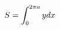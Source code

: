 \documentclass[preview]{standalone}
\begin{document}
\begin{align*}
\special{dvisvgm:raw <g id='unique000'>}S = \int_{0}^{2\pi a} y dx\special{dvisvgm:raw </g>}
\end{align*}
\end{document}
